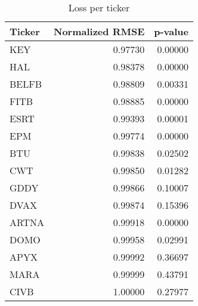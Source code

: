 \begin{table}[H]
\centering
\caption{Loss per ticker}
\label{tab:loss_per_ticker_0}
\begin{tabular}{lrr}
\toprule
Ticker & Normalized RMSE & p-value \\
\midrule
KEY & 0.97730 & 0.00000 \\
HAL & 0.98378 & 0.00000 \\
BELFB & 0.98809 & 0.00331 \\
FITB & 0.98885 & 0.00000 \\
ESRT & 0.99393 & 0.00001 \\
EPM & 0.99774 & 0.00000 \\
BTU & 0.99838 & 0.02502 \\
CWT & 0.99850 & 0.01282 \\
GDDY & 0.99866 & 0.10007 \\
DVAX & 0.99874 & 0.15396 \\
ARTNA & 0.99918 & 0.00000 \\
DOMO & 0.99958 & 0.02991 \\
APYX & 0.99992 & 0.36697 \\
MARA & 0.99999 & 0.43791 \\
CIVB & 1.00000 & 0.27977 \\
\bottomrule
\end{tabular}
\end{table}
